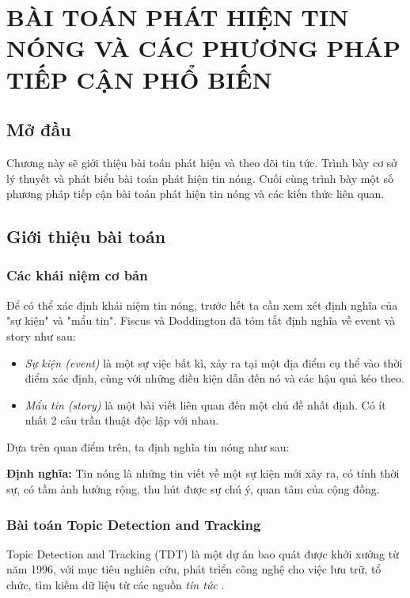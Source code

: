 \chapter{BÀI TOÁN PHÁT HIỆN TIN NÓNG VÀ CÁC PHƯƠNG PHÁP TIẾP CẬN PHỔ BIẾN}
\ifpdf
    \graphicspath{{Chapter2/Chapter2Figs/PNG/}{Chapter2/Chapter2Figs/PDF/}{Chapter2/Chapter2Figs/}}
\else
    \graphicspath{{Chapter2/Chapter2Figs/EPS/}{Chapter2/Chapter2Figs/}}
\fi

\section{Mở đầu}
Chương này sẽ giới thiệu bài toán phát hiện và theo dõi tin tức. Trình bày cơ sở lý thuyết và phát biểu bài toán phát hiện tin nóng. Cuối cùng trình bày một số phương pháp tiếp cận bài toán phát hiện tin nóng và các kiến thức liên quan.

\section{Giới thiệu bài toán} %
	\subsection{Các khái niệm cơ bản}
	Để có thể xác định khái niệm tin nóng, trước hết ta cần xem xét định nghĩa của "sự kiện" và "mẩu tin". Fiscus và Doddington \cite{Fiscus:TDTDefinition} đã tóm tắt định nghĩa về event và story như sau:
	\begin{itemize}
		\item \textit{Sự kiện (event)} là một sự việc bất kì, xảy ra tại một địa điểm cụ thể vào thời điểm xác định, cùng với những điều kiện dẫn đến nó và các hậu quả kéo theo.
		
		\item \textit{Mẩu tin (story)} là một bài viết liên quan đến một chủ đề nhất định. Có ít nhất 2 câu trần thuật độc lập với nhau.
	\end{itemize}
	
	Dựa trên quan điểm trên, ta định nghĩa tin nóng như sau:
	
	\textbf{Định nghĩa:} Tin nóng là những tin viết về một sự kiện mới xảy ra, có tính thời sự, có tầm ảnh hưởng rộng, thu hút được sự chú ý, quan tâm của cộng đồng.

%
	\subsection{Bài toán Topic Detection and Tracking}
	Topic Detection and Tracking (TDT) là một dự án bao quát được khởi xướng từ năm 1996, với mục tiêu nghiên cứu, phát triển công nghệ cho việc lưu trữ, tổ chức, tìm kiếm dữ liệu từ các nguồn \textit{tin tức} \cite{Fiscus:TDTDefinition}.
	

